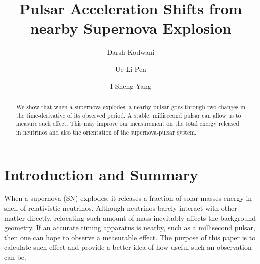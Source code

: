 \documentclass[aps,showpacs,twocolumn,floats,prd,superscriptaddress,nofootinbib]{revtex4}
\begin{document}
\title{Pulsar Acceleration Shifts from nearby Supernova Explosion}

\author{Darsh Kodwani}

\author{Ue-Li Pen}

\author{I-Sheng Yang}

\begin{abstract}
We show that when a supernova explodes, a nearby pulsar goes through two changes in the time-derivative of its observed period. A stable, millisecond pulsar can allow us to measure such effect. This may improve our measurement on the total energy released in neutrinos and also the orientation of the supernova-pulsar system. 
\end{abstract}

\maketitle

\section{Introduction and Summary}

When a supernova (SN) explodes, it releases a fraction of solar-masses energy in shell of relativistic neutrinos. Although neutrinos barely interact with other matter directly, relocating such amount of mass inevitably affects the background geometry. If an accurate timing apparatus is nearby, such as a millisecond pulsar, then one can hope to observe a measurable effect. The purpose of this paper is to calculate such effect and provide a better idea of how useful such an observation can be.
\end{document}
